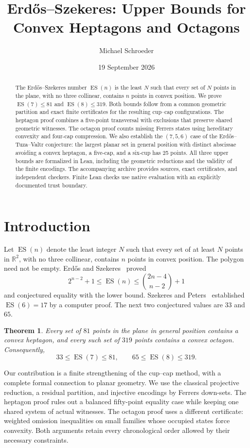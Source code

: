 \documentclass[11pt]{amsart}
\title[Convex heptagons and octagons]{Erd\H{o}s--Szekeres: Upper Bounds for Convex Heptagons and Octagons}
\author{Michael Schroeder}
\date{19 September 2026}
\numberwithin{equation}{section}
\newtheorem{theorem}{Theorem}[section]
\theoremstyle{definition}
\theoremstyle{remark}
\DeclareMathOperator{\ES}{ES}
\begin{document}
\begin{abstract}
The Erd\H{o}s--Szekeres number $\ES(n)$ is the least $N$ such that
every set of $N$ points in the plane, with no three collinear, contains
$n$ points in convex position. We prove $\ES(7)\le81$ and
$\ES(8)\le319$. Both bounds follow from a common geometric partition
and exact finite certificates for the resulting cup--cap configurations.
The heptagon proof combines a five-point transversal with exclusions
that preserve shared geometric witnesses. The octagon proof counts
missing Ferrers states using hereditary convexity and four-cap compression.
We also establish the $(7,5,6)$ case of the Erd\H{o}s--Tuza--Valtr
conjecture: the largest planar set in general position with distinct
abscissae avoiding a convex heptagon, a five-cap, and a six-cup has
25 points. All three upper bounds are formalized in Lean,
including the geometric reductions and the validity of the finite
encodings. The accompanying archive provides sources, exact certificates,
and independent checkers. Finite Lean checks use native evaluation
with an explicitly documented trust boundary.
\end{abstract}
\maketitle
\raggedbottom

\section{Introduction}
Let $\ES(n)$ denote the least integer $N$ such that every set of at least
$N$ points in $\mathbb R^2$, with no three collinear, contains $n$ points
in convex position. The polygon need not be empty. Erd\H{o}s and
Szekeres~\cite{ES35,ES61} proved
\[
 2^{n-2}+1\le\ES(n)\le\binom{2n-4}{n-2}+1
\]
and conjectured equality with the lower bound. Szekeres and
Peters~\cite{SP} established $\ES(6)=17$ by a computer proof.
The next two conjectured values are $33$ and $65$.

\begin{theorem}\label{thm:main}
Every set of $81$ points in the plane in general position contains a
convex heptagon, and every such set of $319$ points contains a convex
octagon. Consequently,
\[
 33\le\ES(7)\le81,\qquad 65\le\ES(8)\le319.
\]
\end{theorem}

Our contribution is a finite strengthening of the cup--cap method,
with a complete formal connection to planar geometry. We use the
classical projective reduction, a residual partition, and injective
encodings by Ferrers down-sets. The heptagon proof rules out a balanced
fifty-point equality case while keeping one shared system of actual
witnesses. The octagon proof uses a different certificate: weighted
omission inequalities on small families whose occupied states force
convexity. Both arguments retain every chronological order allowed by
their necessary constraints.
\end{document}
